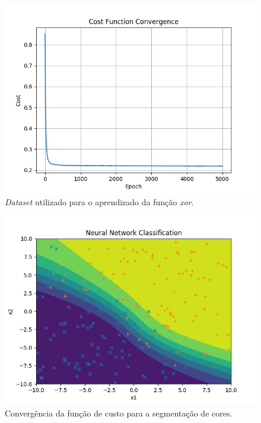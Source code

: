 \documentclass[conference]{IEEEtran}
\begin{document}
\begin{figure}[htbp]
\centering
\centerline{\includegraphics[scale=0.5]{imagens/sum_gt_zero/convergence_sgz.png}}
\caption{\textit{Dataset} utilizado para o aprendizado da função \textit{xor}.}
\label{sum_gt_zero/convergence_sgz}
\end{figure}

\begin{figure}[htbp]
\centering
\centerline{\includegraphics[scale=0.5]{imagens/sum_gt_zero/nn_classification_sgz.png}}
\caption{Convergência da função de custo para a segmentação de cores.}
\label{sum_gt_zero/nn_classification_sgz}
\end{figure}
\end{document}
